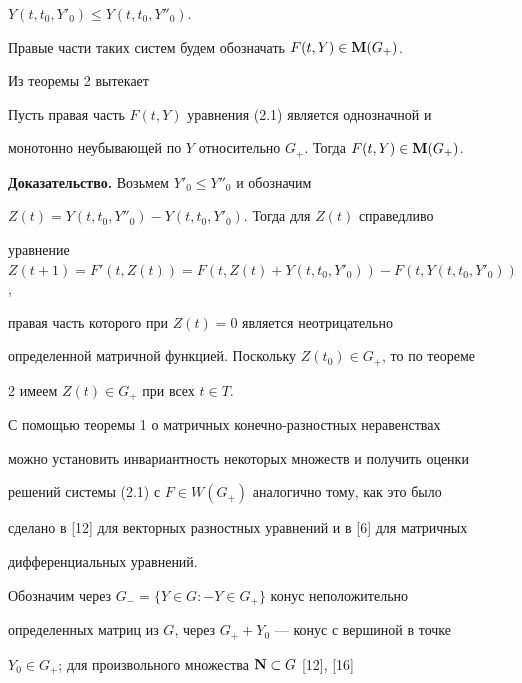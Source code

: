 $Y(t,t_0,Y'_0)\le Y(t,t_0,Y''_0)$.





Правые части таких систем будем обозначать $F(t,Y)\in\bold M(G_+)$.





Из теоремы 2 вытекает





\begin{cor}


Пусть правая часть $F(t,Y)$ уравнения (2.1) является однозначной и


монотонно неубывающей по $Y$ относительно $G_+$. Тогда $F(t,Y)\in\bold


M(G_+)$.


\end{cor}





{\bf Доказательство.} Возьмем $Y'_0\le Y''_0$ и обозначим


$Z(t)=Y(t,t_0,Y''_0)-Y(t,t_0,Y'_0)$. Тогда для $Z(t)$ справедливо


уравнение $Z(t+1)=F'(t,Z(t))= F(t,Z(t)+ Y(t,t_0,Y'_0))- F(t,Y(t,t_0,Y'_0))$,


правая часть которого при $Z(t)=0$ является неотрицательно


определенной матричной функцией. Поскольку $Z(t_0)\in G_+$, то по теореме


2 имеем $Z(t)\in G_+$ при всех $t\in T$.





С помощью теоремы 1 о матричных конечно-разностных неравенствах


можно установить инвариантность некоторых множеств и получить оценки


решений системы (2.1) с $F\in W(G_+)$ аналогично тому, как это было


сделано в [12] для векторных разностных уравнений и в [6] для матричных


дифференциальных уравнений.





Обозначим через $G_-=\{Y\in G:-Y\in G_+\}$ конус неположительно


определенных матриц из $G$, через $G_++Y_0$ --- конус с вершиной в точке


$Y_0\in G_+$; для произвольного множества $\bold N\subset G$ [12], [16]


